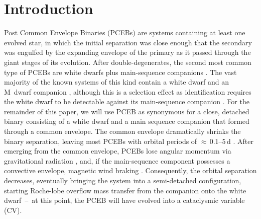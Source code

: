 \documentclass[fleqn,usenatbib]{mnras}
\newcommand{\grout}[1]{\textcolor{lightgray}{#1}}
\begin{document}

\section{Introduction}
Post Common Envelope Binaries (PCEBs) are systems containing at least one evolved star, in which the initial separation was close enough that the secondary was engulfed by the expanding envelope of the primary as it passed through the giant stages of its evolution. After double-degenerates, the second most common type of PCEBs are white dwarfs plus main-sequence companions \citep{toonenetal17-1}. The vast majority of the known systems of this kind contain a white dwarf and an M~dwarf companion \citep{rebassa-mansergasetal10-1}, although this is a selection effect as identification requires the white dwarf to be detectable against its main-sequence companion \citep{inightetal21-1}. For the remainder of this paper, we will use PCEB as synonymous for a close, detached binary consisting of a white dwarf and a main sequence companion that formed through a common envelope. The common envelope dramatically shrinks the binary separation, leaving most PCEBs with orbital periods of $\approx$\,0.1--5\,d \citep{nebotetal11-1}. After emerging from the common envelope, PCEBs lose angular momentum via gravitational radiation \citep{paczynski+sienkiewicz81-1}, and, if the main-sequence component possesses a convective envelope, magnetic wind braking \citep{rappaportetal83-1}. Consequently, the orbital separation decreases, eventually bringing the system into a semi-detached configuration, starting Roche-lobe overflow mass transfer from the companion onto the white dwarf~--~at this point, the PCEB will have evolved into a cataclysmic variable (CV). 


\end{document}
